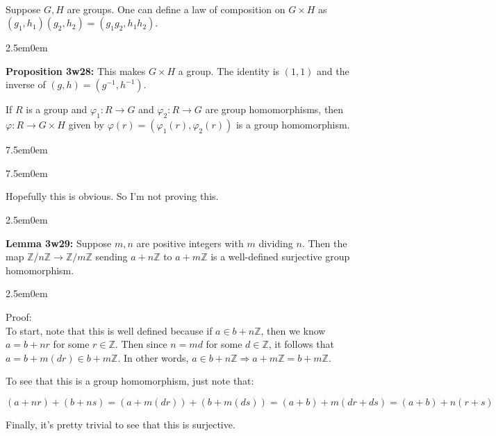 \documentclass{book}
\newcommand{\hOne}{%
   \color{Black}%
   \fontsize{14}{16}\selectfont%
}
\newcommand{\hTwo}{%
\color{MidnightBlue}%
   \fontsize{13}{15}\selectfont%
}
\newcommand{\hThree}{%
   \color{PineGreen!85!Orange}
   \fontsize{12}{14}\selectfont%
}
\newcommand{\myComment}{%
   \color{RawerSienna}%
   \fontsize{12}{14}\selectfont%
}
\newenvironment{myIndent}{%
   \begin{adjustwidth}{2.5em}{0em}%
}{%
   \end{adjustwidth}%
}
\newenvironment{myTindent}{%
   \begin{adjustwidth}{7.5em}{0em}%
}{%
   \end{adjustwidth}%
}
\newcommand{\blab}[1]{\textbf{#1}}
\newcommand{\mySepTwo}[1][.]{%
   {\noindent\color{#1}{\rule{6.5in}{0.5mm}}}\\%
}
\newcommand{\retTwo}{\hfill\bigbreak}
\begin{document}
\hOne\mySepTwo

Suppose $G, H$ are groups. One can define a law of composition on $G \times H$ as\\ $(g_1, h_1)(g_2, h_2) = (g_1g_2, h_1h_2)$.\\ [-10pt]
\begin{myIndent}\hTwo
	\blab{Proposition 3w28:} This makes $G \times H$ a group. The identity is $(1, 1)$ and the inverse of $(g, h) = (g^{-1}, h^{-1})$.\retTwo
\end{myIndent}

If $R$ is a group and $\varphi_1: R \longrightarrow G$ and $\varphi_2: R \longrightarrow G$ are group homomorphisms, then $\varphi: R \longrightarrow G \times H$ given by $\varphi(r) = (\varphi_1(r), \varphi_2(r))$ is a group homomorphism.

\begin{myTindent}\begin{myTindent}\myComment
	Hopefully this is obvious. So I'm not proving this.\retTwo
\end{myTindent}\end{myTindent}

\begin{myIndent}\hTwo
	\blab{Lemma 3w29:} Suppose $m, n$ are positive integers with $m$ dividing $n$. Then the map $\mathbb{Z} / n\mathbb{Z} \longrightarrow \mathbb{Z}/m\mathbb{Z}$ sending $a + n\mathbb{Z}$ to $a + m\mathbb{Z}$ is a well-defined surjective group homomorphism.
	
	\begin{myIndent}\hThree
		Proof:\\
		To start, note that this is well defined because if $a \in b + n\mathbb{Z}$, then we know\\ $a = b + nr$ for some $r \in \mathbb{Z}$. Then since $n = md$ for some $d \in \mathbb{Z}$, it follows that\\ $a = b + m(dr) \in b + m\mathbb{Z}$. In other words, $a \in b + n\mathbb{Z} \Longrightarrow a + m\mathbb{Z} = b + m\mathbb{Z}$.\retTwo

		To see that this is a group homomorphism, just note that:

		{\centering\fontsize{11.5}{13.5} $(a + nr) + (b + ns) = (a + m(dr)) + (b + m(ds)) = (a + b) + m(dr + ds) = (a + b) + n(r + s)$ \retTwo\par}

		Finally, it's pretty trivial to see that this is surjective.\newpage
	\end{myIndent}
\end{myIndent}
\end{document}
